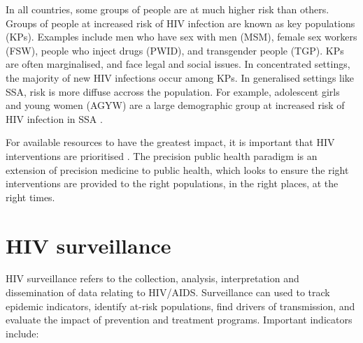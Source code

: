 \documentclass[a4paper, nobind]{templates/ociamthesis}
\begin{document}
In all countries, some groups of people are at much higher risk than others.
Groups of people at increased risk of HIV infection are known as key populations (KPs).
Examples include men who have sex with men (MSM), female sex workers (FSW), people who inject drugs (PWID), and transgender people (TGP).
KPs are often marginalised, and face legal and social issues.
In concentrated settings, the majority of new HIV infections occur among KPs.
In generalised settings like SSA, risk is more diffuse accross the population.
For example, adolescent girls and young women (AGYW) are a large demographic group at increased risk of HIV infection in SSA \autocite{risher2021age,monod2023growing}.

For available resources to have the greatest impact, it is important that HIV interventions are prioritised \autocite{ord2013moral}.
The precision public health paradigm \autocite{khoury2016precision} is an extension of precision medicine to public health, which looks to ensure the right interventions are provided to the right populations, in the right places, at the right times.

\hypertarget{hiv-surveillance}{%
\section{\texorpdfstring{HIV surveillance \label{sec:surveillance}}{HIV surveillance }}\label{hiv-surveillance}}

HIV surveillance refers to the collection, analysis, interpretation and dissemination of data relating to HIV/AIDS.
Surveillance can used to track epidemic indicators, identify at-risk populations, find drivers of transmission, and evaluate the impact of prevention and treatment programs.
Important indicators include:
\end{document}
